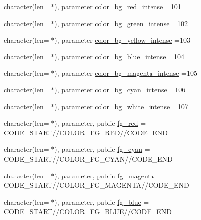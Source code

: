 \begin{DoxyCompactItemize}
\item 
character(len= $\ast$), parameter \mbox{\hyperlink{namespacem__escape_aff3cc89066b789384257efec08bf5123}{color\+\_\+bg\+\_\+red\+\_\+intense}} =\textquotesingle{}101\textquotesingle{}
\item 
character(len= $\ast$), parameter \mbox{\hyperlink{namespacem__escape_a9ee5d5f2d0522ca3ea194de4d9a05dc3}{color\+\_\+bg\+\_\+green\+\_\+intense}} =\textquotesingle{}102\textquotesingle{}
\item 
character(len= $\ast$), parameter \mbox{\hyperlink{namespacem__escape_a79f01235a5d3b2ea250274a7ca1c2c43}{color\+\_\+bg\+\_\+yellow\+\_\+intense}} =\textquotesingle{}103\textquotesingle{}
\item 
character(len= $\ast$), parameter \mbox{\hyperlink{namespacem__escape_aac30abbb8eb6e1570e28dac2326113a7}{color\+\_\+bg\+\_\+blue\+\_\+intense}} =\textquotesingle{}104\textquotesingle{}
\item 
character(len= $\ast$), parameter \mbox{\hyperlink{namespacem__escape_af148e03515e36ed552e330ba495bcbba}{color\+\_\+bg\+\_\+magenta\+\_\+intense}} =\textquotesingle{}105\textquotesingle{}
\item 
character(len= $\ast$), parameter \mbox{\hyperlink{namespacem__escape_a6be9fe26e904b8714e035412ae4e6ad4}{color\+\_\+bg\+\_\+cyan\+\_\+intense}} =\textquotesingle{}106\textquotesingle{}
\item 
character(len= $\ast$), parameter \mbox{\hyperlink{namespacem__escape_af57687b3c8741aaab4c67bc1c697aeda}{color\+\_\+bg\+\_\+white\+\_\+intense}} =\textquotesingle{}107\textquotesingle{}
\item 
character(len= $\ast$), parameter, public \mbox{\hyperlink{namespacem__escape_a615ac74b8d93904b5fb35fd656f18aa3}{fg\+\_\+red}} = C\+O\+D\+E\+\_\+\+S\+T\+A\+RT//C\+O\+L\+O\+R\+\_\+\+F\+G\+\_\+\+R\+ED//C\+O\+D\+E\+\_\+\+E\+ND
\item 
character(len= $\ast$), parameter, public \mbox{\hyperlink{namespacem__escape_abdd10ab49027c01752c5a165d42dca95}{fg\+\_\+cyan}} = C\+O\+D\+E\+\_\+\+S\+T\+A\+RT//C\+O\+L\+O\+R\+\_\+\+F\+G\+\_\+\+C\+Y\+AN//C\+O\+D\+E\+\_\+\+E\+ND
\item 
character(len= $\ast$), parameter, public \mbox{\hyperlink{namespacem__escape_a44464db3bf2f3277b04e505bf79061a4}{fg\+\_\+magenta}} = C\+O\+D\+E\+\_\+\+S\+T\+A\+RT//C\+O\+L\+O\+R\+\_\+\+F\+G\+\_\+\+M\+A\+G\+E\+N\+TA//C\+O\+D\+E\+\_\+\+E\+ND
\item 
character(len= $\ast$), parameter, public \mbox{\hyperlink{namespacem__escape_a94792b1429eb9880530d93643e9ce22c}{fg\+\_\+blue}} = C\+O\+D\+E\+\_\+\+S\+T\+A\+RT//C\+O\+L\+O\+R\+\_\+\+F\+G\+\_\+\+B\+L\+UE//C\+O\+D\+E\+\_\+\+E\+ND

\end{DoxyCompactItemize}
